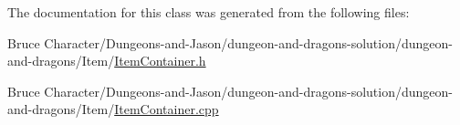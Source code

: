 The documentation for this class was generated from the following files\+:\begin{DoxyCompactItemize}
\item 
Bruce Character/\+Dungeons-\/and-\/\+Jason/dungeon-\/and-\/dragons-\/solution/dungeon-\/and-\/dragons/\+Item/\hyperlink{_item_container_8h}{Item\+Container.\+h}\item 
Bruce Character/\+Dungeons-\/and-\/\+Jason/dungeon-\/and-\/dragons-\/solution/dungeon-\/and-\/dragons/\+Item/\hyperlink{_item_container_8cpp}{Item\+Container.\+cpp}\end{DoxyCompactItemize}
